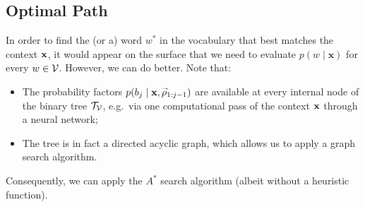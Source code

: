 \documentclass[a4paper]{article}
\newcommand{\rvec}[1]{\accentset{\rightarrow}{#1}}
\begin{document}
\subsection{Optimal Path}

In order to find the (or a) word $w^*$ in the vocabulary that best matches the context ${\bf x}$, it would appear on the surface
that we need to evaluate $p(w\;|\;\textbf{x})$ for every $w\in{\cal V}$. However, we can do better. Note that:
\begin{itemize}
\item The probability factors $p(b_j\;|\;\textbf{x},\rvec{\rho}_{1:j-1})$ are available at every internal node of the binary tree ${\cal T}_{\cal V}$,
e.g.\ via one computational pass of the context ${\bf x}$ through a neural network;

\item The tree is in fact a directed acyclic graph, which allows us to apply a graph search algorithm.
\end{itemize}
Consequently, we can apply the $A^*$ search algorithm (albeit without a heuristic function).
\end{document}
